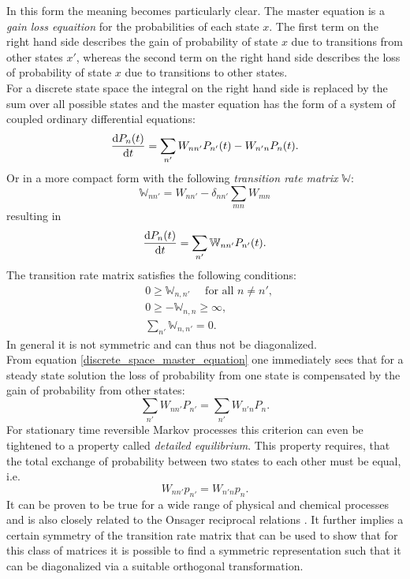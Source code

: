 In this form the meaning becomes particularly clear. The master equation is a \textit{gain loss equaition} for the probabilities of each state $x$. The first term on the right hand side describes the gain of probability of state $x$ due to transitions from other states $x'$, whereas the second term on the right hand side describes the loss of probability of state $x$ due to transitions to other states.\\
For a discrete state space the integral on the right hand side is replaced by the sum over all possible states and the master equation has the form of a system of coupled ordinary differential equations:
\begin{equation}
    \frac{{\rm d} P_n(t)}{{\rm d} t} = \sum_{n'} W_{n n'}P_{n'}(t) - W_{n'n}P_{n}(t).
    \label{discrete_space_master_equation}
\end{equation}
Or in a more compact form with the following \emph{transition rate matrix} $\mathbb{W}$:
\begin{equation}
    \mathbb{W}_{n n'} = W_{n n'} - \delta_{n n'}\sum\limits_{m n} W_{m n}
    \label{transition_rate_matrix}
\end{equation}
resulting in 
\begin{equation}
    \frac{{\rm d} P_n(t)}{{\rm d} t} = \sum_{n'} \mathbb{W}_{n n'}P_{n'}(t).
    \label{ME3}
\end{equation}
The transition rate matrix satisfies the following conditions:
\begin{align*}
    &0 \ge \mathbb{W}_{n,n'} \quad \mbox{ for all } n \ne n', \\
    &0 \ge -\mathbb{W}_{n,n} \ge \infty, \\
    &\sum_{n'} \mathbb{W}_{n,n'} = 0.
    \label{Transitions_rate_matrix}
\end{align*}
In general it is not symmetric and can thus not be diagonalized. \\
From equation \eqref{discrete_space_master_equation} one immediately sees that for a steady state solution the loss of probability from one state is compensated by the gain of probability from other states:\\
\begin{equation}
    \sum\limits_{n'} W_{n n'}P_{n'} = \sum\limits_{n'}W_{n' n} P_n.
    \label{equilibrium}
\end{equation}
For stationary time reversible Markov processes this criterion can even be tightened to a property called \textit{detailed equilibrium}.
This property requires, that the total exchange of probability between two states to each other must be equal, i.e.
\begin{equation}
     W_{n n'}p_{n'} = W_{n'n}p_{n}.
    \label{detailed_balance}
\end{equation}
It can be proven to be true for a wide range of physical and chemical processes \cite{Boltzmann1872,Einstein1917,Wegscheider1911} and is also closely related to the Onsager reciprocal relations \cite{Onsager1931,Wigner1954}.
It further implies a certain symmetry of the transition rate matrix that can be used to show that for this class of matrices it is possible to find a symmetric representation such that it can be diagonalized via a suitable orthogonal transformation\cite{Oppenheim1977}.
